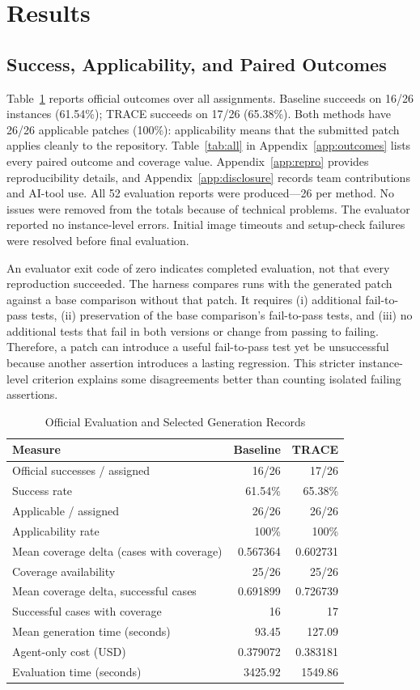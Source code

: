 \section{Results}
\subsection{Success, Applicability, and Paired Outcomes}
Table~\ref{tab:results} reports official outcomes over all assignments. Baseline succeeds on 16/26 instances (61.54\%); TRACE succeeds on 17/26 (65.38\%). Both methods have 26/26 applicable patches (100\%): applicability means that the submitted patch applies cleanly to the repository. Table~\ref{tab:all} in Appendix~\ref{app:outcomes} lists every paired outcome and coverage value. Appendix~\ref{app:repro} provides reproducibility details, and Appendix~\ref{app:disclosure} records team contributions and AI-tool use. All 52 evaluation reports were produced---26 per method. No issues were removed from the totals because of technical problems. The evaluator reported no instance-level errors. Initial image timeouts and setup-check failures were resolved before final evaluation.

An evaluator exit code of zero indicates completed evaluation, not that every reproduction succeeded. The harness compares runs with the generated patch against a base comparison without that patch. It requires (i) additional fail-to-pass tests, (ii) preservation of the base comparison's fail-to-pass tests, and (iii) no additional tests that fail in both versions or change from passing to failing. Therefore, a patch can introduce a useful fail-to-pass test yet be unsuccessful because another assertion introduces a lasting regression. This stricter instance-level criterion explains some disagreements better than counting isolated failing assertions.

\begin{table}[t]
\caption{Official Evaluation and Selected Generation Records}
\label{tab:results}
\centering\small
\begin{tabular}{@{}p{}rr@{}}
\toprule
Measure & Baseline & TRACE\\
\midrule
Official successes / assigned & 16/26 & 17/26\\
Success rate & 61.54\% & 65.38\%\\
Applicable / assigned & 26/26 & 26/26\\
Applicability rate & 100\% & 100\%\\
Mean coverage delta (cases with coverage) & 0.567364 & 0.602731\\
Coverage availability & 25/26 & 25/26\\
Mean coverage delta, successful cases & 0.691899 & 0.726739\\
Successful cases with coverage & 16 & 17\\
Mean generation time (seconds) & 93.45 & 127.09\\
Agent-only cost (USD) & 0.379072 & 0.383181\\
Evaluation time (seconds) & 3425.92 & 1549.86\\
\bottomrule
\end{tabular}
\end{table}

